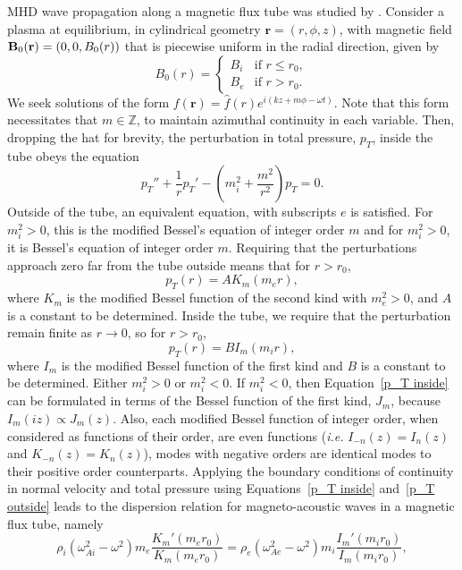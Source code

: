 MHD wave propagation along a magnetic flux tube was studied by \cite{edw_etal83}. Consider a plasma at equilibrium, in cylindrical geometry $\mathbf{r} = (r, \phi, z)$, with magnetic field $\mathbf{B}_0(\mathbf{r}) = (0, 0, B_0(r))$ that is piecewise uniform in the radial direction, given by
\begin{equation}
B_0(r) =
\begin{cases}
B_i & \text{if } r \leq r_0, \\
B_e & \text{if } r > r_0.
\end{cases}
\end{equation}
We seek solutions of the form $f(\mathbf{r}) = \widehat{f}(r)e^{i(kz + m\phi - \omega t)}$. Note that this form necessitates that $m \in \mathbb{Z}$, to maintain azimuthal continuity in each variable. Then, dropping the hat for brevity, the perturbation in total pressure, $p_T$, inside the tube obeys the equation
\begin{equation}
	p_T'' + \frac{1}{r}p_T' - (m_i^2 + \frac{m^2}{r^2})p_T = 0.
\end{equation}
Outside of the tube, an equivalent equation, with subscripts $e$ is satisfied. For $m_i^2 > 0$, this is the modified Bessel's equation of integer order $m$ and for $m_i^2 > 0$, it is Bessel's equation of integer order $m$. Requiring that the perturbations approach zero far from the tube outside means that for $r > r_0$,
\begin{equation}
	p_T(r) = A K_m(m_e r), \label{p_T outside}
\end{equation}
where $K_m$ is the modified Bessel function of the second kind with $m_e^2 > 0$, and $A$ is a constant to be determined. Inside the tube, we require that the perturbation remain finite as $r \to 0$, so for $r > r_0$,
\begin{equation}
	p_T(r) = B I_m(m_i r), \label{p_T inside}
\end{equation}
where $I_m$ is the modified Bessel function of the first kind and $B$ is a constant to be determined. Either $m_i^2 > 0$ or $m_i^2 < 0$. If $m_i^2 < 0$, then Equation~\eqref{p_T inside} can be formulated in terms of the Bessel function of the first kind, $J_m$, because $I_m(iz) \propto J_m(z)$. Also, each modified Bessel function of integer order, when considered as functions of their order, are even functions (\textit{i.e.} $I_{-n} (z) = I_n(z)$ and $K_{-n} (z) = K_n(z)$), modes with negative orders are identical modes to their positive order counterparts. Applying the boundary conditions of continuity in normal velocity and total pressure using Equations~\eqref{p_T inside} and~\eqref{p_T outside} leads to the dispersion relation for magneto-acoustic waves in a magnetic flux tube, namely
\begin{equation}
\rho_i(\omega_{Ai}^2 - \omega^2)m_e\frac{K_m'(m_er_0)}{K_m(m_er_0)} = \rho_e(\omega_{Ae}^2 - \omega^2)m_i\frac{I_m'(m_ir_0)}{I_m(m_ir_0)},
\end{equation}

